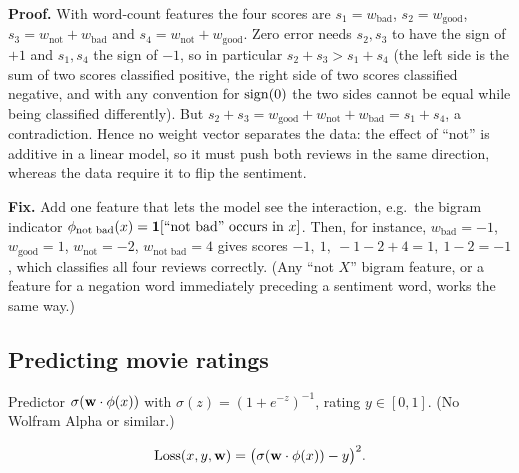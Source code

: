 \begin{solution}
\textbf{Proof.} With word-count features the four scores are
$s_1=w_{\text{bad}}$, $s_2=w_{\text{good}}$, $s_3=w_{\text{not}}+w_{\text{bad}}$ and
$s_4=w_{\text{not}}+w_{\text{good}}$. Zero error needs $s_2,s_3$ to have the sign of $+1$ and $s_1,s_4$
the sign of $-1$, so in particular $s_2+s_3>s_1+s_4$ (the left side is the sum of two scores classified
positive, the right side of two scores classified negative, and with any convention for $\operatorname{sign}(0)$ the two
sides cannot be equal while being classified differently). But
$s_2+s_3=w_{\text{good}}+w_{\text{not}}+w_{\text{bad}}=s_1+s_4$, a contradiction. Hence no weight vector
separates the data: the effect of ``not'' is additive in a linear model, so it must push both reviews in the
same direction, whereas the data require it to flip the sentiment.

\textbf{Fix.} Add one feature that lets the model see the interaction, e.g.\ the bigram indicator
$\phi_{\text{not bad}}(x)=\mathbf{1}[\text{``not bad'' occurs in }x]$. Then, for instance,
$w_{\text{bad}}=-1$, $w_{\text{good}}=1$, $w_{\text{not}}=-2$, $w_{\text{not bad}}=4$ gives scores
$-1,\ 1,\ -1-2+4=1,\ 1-2=-1$, which classifies all four reviews correctly. (Any ``not $X$'' bigram feature,
or a feature for a negation word immediately preceding a sentiment word, works the same way.)
\end{solution}

\subsection{Predicting movie ratings}

Predictor $\sigma(\mathbf{w}\cdot\phi(x))$ with $\sigma(z)=(1+e^{-z})^{-1}$, rating $y\in[0,1]$.
(No Wolfram Alpha or similar.)

\begin{solution}
\[
\text{Loss}(x,y,\mathbf{w})=\bigl(\sigma(\mathbf{w}\cdot\phi(x))-y\bigr)^2 .
\]
\end{solution}

